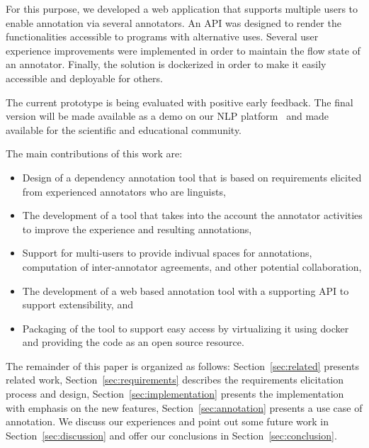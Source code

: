 For this purpose, we developed a web application that supports multiple users to enable annotation via several annotators.
An API was designed to render the functionalities accessible to programs with alternative uses.
Several user experience improvements were implemented in order to maintain the flow state of an annotator.
Finally, the solution is dockerized in order to make it easily accessible and deployable for others. 

The current prototype is being evaluated with positive early feedback. 
The final version will be made available as a demo on our NLP platform~\cite{DIP} and made available for the scientific and educational community. 

The main contributions of this work are:
\begin{itemize}
        \item Design of a dependency annotation tool that is based on requirements elicited from experienced annotators who are linguists,
        \item The development of a tool that takes into the account the annotator activities to improve the experience and resulting annotations,
        \item Support for multi-users to provide indivual spaces for annotations, computation of inter-annotator agreements, and other potential collaboration, 
        \item The development of a web based annotation tool with a supporting API to support extensibility, and
        \item Packaging of the tool to support easy access by virtualizing it using docker and providing the code as an open source resource. 
\end{itemize}
The remainder of this paper is organized as follows: 
Section~\ref{sec:related} presents related work, 
Section~\ref{sec:requirements} describes the requirements elicitation process and design, 
Section~\ref{sec:implementation} presents the implementation with emphasis on the new features, 
Section~\ref{sec:annotation} presents a use case of annotation.
We discuss our experiences and point out some future work in Section~\ref{sec:discussion} and offer our conclusions  in Section~\ref{sec:conclusion}.
